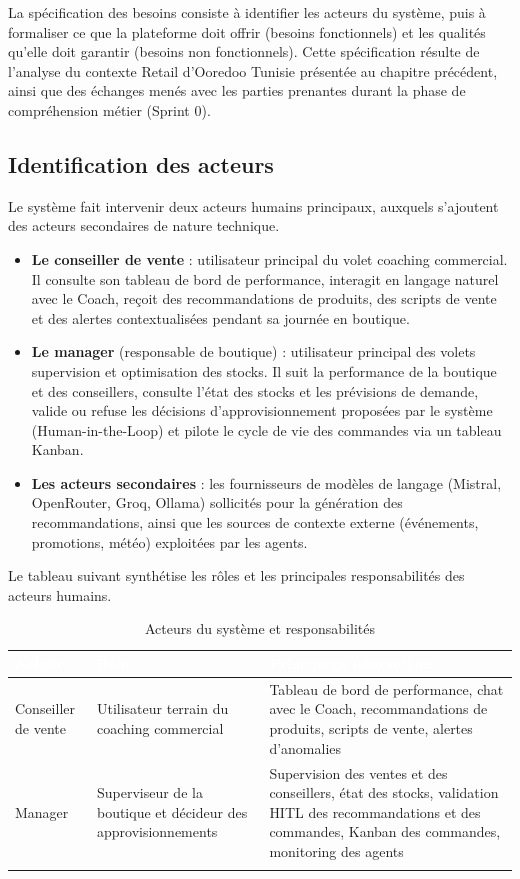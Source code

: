 La spécification des besoins consiste à identifier les acteurs du système, puis à formaliser ce que la plateforme doit offrir (besoins fonctionnels) et les qualités qu'elle doit garantir (besoins non fonctionnels). Cette spécification résulte de l'analyse du contexte Retail d'Ooredoo Tunisie présentée au chapitre précédent, ainsi que des échanges menés avec les parties prenantes durant la phase de compréhension métier (Sprint 0).

\subsection{Identification des acteurs}

Le système fait intervenir deux acteurs humains principaux, auxquels s'ajoutent des acteurs secondaires de nature technique.

\begin{itemize}[label=--]
    \item \textbf{Le conseiller de vente} : utilisateur principal du volet coaching commercial. Il consulte son tableau de bord de performance, interagit en langage naturel avec le Coach, reçoit des recommandations de produits, des scripts de vente et des alertes contextualisées pendant sa journée en boutique.

    \item \textbf{Le manager} (responsable de boutique) : utilisateur principal des volets supervision et optimisation des stocks. Il suit la performance de la boutique et des conseillers, consulte l'état des stocks et les prévisions de demande, valide ou refuse les décisions d'approvisionnement proposées par le système (Human-in-the-Loop) et pilote le cycle de vie des commandes via un tableau Kanban.

    \item \textbf{Les acteurs secondaires} : les fournisseurs de modèles de langage (Mistral, OpenRouter, Groq, Ollama) sollicités pour la génération des recommandations, ainsi que les sources de contexte externe (événements, promotions, météo) exploitées par les agents.
\end{itemize}

Le tableau suivant synthétise les rôles et les principales responsabilités des acteurs humains.

\begin{longtable}{|P{3cm}|P{5.2cm}|P{5.8cm}|}
\hline
{}
\textcolor{white}{\textbf{Acteur}} &
\textcolor{white}{\textbf{Rôle}} &
\textcolor{white}{\textbf{Principales interactions}} \\
\hline
\endhead
\hline
\endfoot
\hline
\endlastfoot
Conseiller de vente &
Utilisateur terrain du coaching commercial &
Tableau de bord de performance, chat avec le Coach, recommandations de produits, scripts de vente, alertes d'anomalies \\
\hline
Manager &
Superviseur de la boutique et décideur des approvisionnements &
Supervision des ventes et des conseillers, état des stocks, validation HITL des recommandations et des commandes, Kanban des commandes, monitoring des agents \\
\hline
\caption{Acteurs du système et responsabilités}
\label{tab:acteurs-chap2}
\end{longtable}

